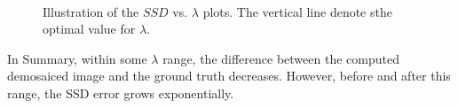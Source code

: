 \documentclass{paper}
\begin{document}
\begin{figure}[h!]
\begin{center}
~
\end{center}
\caption{Illustration of the $SSD$ vs. $\lambda$ plots. The vertical line denote sthe optimal value for $\lambda$.}
\label{fig:ssd_lambda_plots}
\end{figure}

In Summary, within some $\lambda$ range, the difference between the computed demosaiced image and the ground truth decreases. However, before and after this range, the SSD error grows exponentially.
\end{document}
